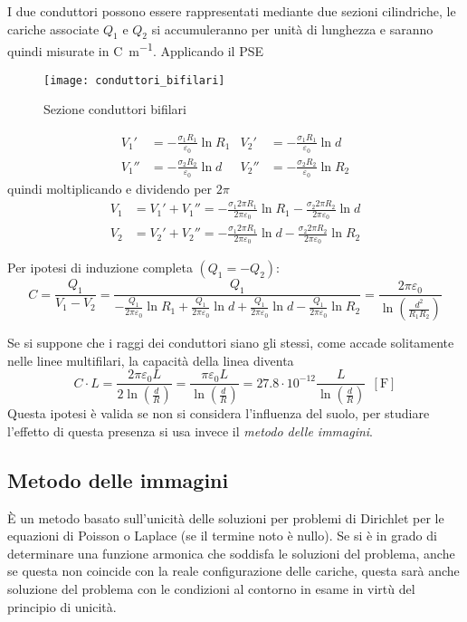 I due conduttori possono essere rappresentati mediante due sezioni cilindriche,
le cariche associate $Q_1$ e $Q_2$ si accumuleranno per unità di lunghezza e 
saranno quindi misurate in \si{\coulomb\per\meter}.
Applicando il PSE
\begin{figure}[H]
\centering
 \texttt{[image: conduttori\_bifilari]}
\caption{Sezione conduttori bifilari}
\end{figure} 

\begin{align*}
V_1' &= -\frac{\sigma_1 R_1}{\varepsilon_0} \ln R_1 & V_2' &= -\frac{\sigma_1 R_1}{\varepsilon_0} \ln d\\
V_1'' &= -\frac{\sigma_2 R_2}{\varepsilon_0} \ln d & V_2'' &= -\frac{\sigma_2 R_2}{\varepsilon_0} \ln R_2
\end{align*}
quindi moltiplicando e dividendo per $2\pi$
\begin{align*}
V_1 &= V_1' + V_1'' = -\frac{\sigma_1 2\pi R_1}{2\pi\varepsilon_0} \ln R_1 -\frac{\sigma_2 2\pi R_2}{2\pi\varepsilon_0} \ln d\\
V_2 &= V_2' + V_2'' = -\frac{\sigma_1 2\pi R_1}{2\pi\varepsilon_0} \ln d  -\frac{\sigma_2 2\pi R_2}{2\pi\varepsilon_0} \ln R_2
\end{align*}

Per ipotesi di induzione completa $(Q_1 = - Q_2)$:
$$
C = \frac{Q_1}{V_1-V_2} = \frac{Q_1}{-\frac{Q_1}{2\pi\varepsilon_0}\ln R_1 + \frac{Q_1}{2\pi\varepsilon_0}\ln d + \frac{Q_1}{2\pi\varepsilon_0}\ln d - \frac{Q_1}{2 \pi \varepsilon_0} \ln R_2} = \frac{2\pi\varepsilon_0}{\ln \left(\frac{d^2}{R_1R_2}\right)}
$$

Se si suppone che i raggi dei conduttori siano gli stessi, come accade solitamente nelle linee multifilari, la capacità della linea diventa
$$
C\cdot L = \frac{2\pi\varepsilon_0 L}{2 \ln \left(\frac{d}{R}\right)} = \frac{\pi \varepsilon_0 L}{\ln \left(\frac{d}{R}\right)} = 27.8\cdot 10^{-12} \frac{L}{\ln\left(\frac{d}{R}\right)}\ \ [\si{\farad}]
$$
Questa ipotesi è valida se non si considera l'influenza del suolo, per studiare l'effetto di questa 
presenza si usa invece il \textit{metodo delle immagini}.

\subsection{Metodo delle immagini}
È un metodo basato sull'unicità delle soluzioni per problemi di Dirichlet per le equazioni di
Poisson o Laplace (se il termine noto è nullo). Se si è in grado di determinare una funzione
armonica che soddisfa le soluzioni del problema, anche se questa non coincide con la reale 
configurazione delle cariche, questa sarà anche soluzione del problema con le condizioni al contorno
in esame in virtù del principio di unicità.

